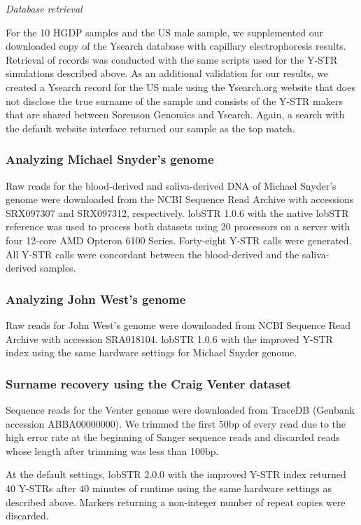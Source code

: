 \emph{Database retrieval}

For the 10 HGDP samples and the US male sample, we supplemented our downloaded copy of the Ysearch database with capillary electrophoresis results. Retrieval of records was conducted with the same scripts used for the Y-STR simulations described above. As an additional validation for our results, we created a Ysearch record for the US male using the Ysearch.org website that does not disclose the true surname of the sample and consists of the Y-STR makers that are shared between Sorenson Genomics and Ysearch. Again, a search with the default website interface returned our sample as the top match.

\subsubsection{Analyzing Michael Snyder's genome}
Raw reads for the blood-derived and saliva-derived DNA of Michael Snyder's genome were downloaded from the NCBI Sequence Read Archive with accessions SRX097307 and SRX097312, respectively. lobSTR 1.0.6 with the native lobSTR reference was used to process both datasets using 20 processors on a server with four 12-core AMD Opteron 6100 Series. Forty-eight Y-STR calls were generated. All Y-STR calls were concordant between the blood-derived and the saliva-derived samples. 

\subsubsection{Analyzing John West's genome}

Raw reads for John West's genome were downloaded from NCBI Sequence Read Archive with accession SRA018104. lobSTR 1.0.6 with the improved Y-STR index using the same hardware settings for Michael Snyder genome. 


\subsubsection{Surname recovery using the Craig Venter dataset}
Sequence reads for the Venter genome were downloaded from TraceDB (Genbank accession ABBA00000000). We trimmed the first 50bp of every read due to the high error rate at the beginning of Sanger sequence reads and discarded reads whose length after trimming was less than 100bp. 

At the default settings, lobSTR 2.0.0 with the improved Y-STR index returned 40 Y-STRs after 40 minutes of runtime using the same hardware settings as described above. Markers returning a non-integer number of repeat copies were discarded. 

